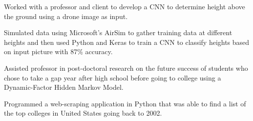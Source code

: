\documentclass[letterpaper]{deedy-resume}
\begin{document}
\begin{minipage}[t]{0.65\textwidth}
\begin{tightitemize}
\item Worked with a professor and client to develop a CNN to determine height above the ground using a drone image as input. \\
\item Simulated data using Microsoft's AirSim to gather training data at different heights and then used Python and Keras to train a CNN to classify heights based on input picture with 87\% accuracy.\\
\end{tightitemize}
\sectionspace 

\begin{tightitemize}
\item Assisted professor in post-doctoral research on the future success of students who chose to take a gap year after high school before going to college using a Dynamic-Factor Hidden Markov Model. \\
\item Programmed a web-scraping application in Python that was able to find a list of the top colleges in United States going back to 2002.\\ 
\end{tightitemize}
\sectionspace 

\end{minipage}
\end{document}
